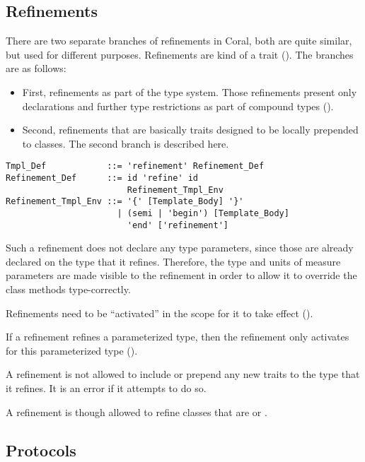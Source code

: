 \subsection{Refinements}
\label{sec:refinements}

There are two separate branches of refinements in Coral, both are quite similar, but used for different purposes. Refinements are kind of a trait (). The branches are as follows:
\begin{itemize}
\item[]
First, refinements as part of the type system. Those refinements present only declarations and further type restrictions as part of compound types ().

\item[]
Second, refinements that are basically traits designed to be locally prepended to classes. The second branch is described here. 
\end{itemize}

\syntax\begin{lstlisting}
Tmpl_Def            ::= 'refinement' Refinement_Def
Refinement_Def      ::= id 'refine' id 
                        Refinement_Tmpl_Env
Refinement_Tmpl_Env ::= '{' [Template_Body] '}'
                      | (semi | 'begin') [Template_Body] 
                        'end' ['refinement']
\end{lstlisting}

Such a refinement does not declare any type parameters, since those are already declared on the type that it refines. Therefore, the type and units of measure parameters are made visible to the refinement in order to allow it to override the class methods type-correctly. 

Refinements need to be ``activated'' in the scope for it to take effect ().

If a refinement refines a parameterized type, then the refinement only activates for this parameterized type (). 

A refinement is not allowed to include or prepend any new traits to the type that it refines. It is an error if it attempts to do so. 

A refinement is though allowed to refine classes that are  or . 






\subsection{Protocols}
\label{sec:protocols}

